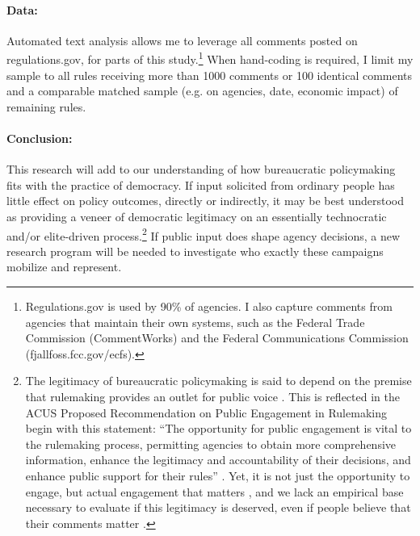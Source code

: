 \paragraph{Data:} Automated text analysis allows me to leverage all comments posted on regulations.gov, for parts of this study.\footnote{Regulations.gov is used by 90\% of agencies. I also capture comments from agencies that maintain their own systems, such as the Federal Trade Commission (CommentWorks) and the Federal Communications Commission (fjallfoss.fcc.gov/ecfs).} When hand-coding is required, I limit my sample to all rules receiving more than 1000 comments or 100 identical comments and a comparable matched sample (e.g. on agencies, date, economic impact) of remaining rules. %






\paragraph{Conclusion:} This research will add to our understanding of how  bureaucratic policymaking fits with the practice of democracy.
If input solicited from ordinary people has little effect on policy outcomes, directly or indirectly, it may be best understood as providing a veneer of democratic legitimacy on an essentially technocratic and/or elite-driven process.\footnote{
The legitimacy of bureaucratic policymaking is said to depend on the premise that rulemaking provides an outlet for public voice \citep{Croley2003, Rosenbloom2003}. This is reflected in the ACUS Proposed Recommendation on Public Engagement in Rulemaking begin with this statement: ``The opportunity for public engagement is vital to the rulemaking process, permitting agencies to obtain more comprehensive information, enhance the legitimacy and accountability of their decisions, and enhance public support for their rules'' \citep{ACUS2018}. Yet, it is not just the opportunity to engage, but actual engagement that matters \citep{Herz2018}, and we lack an empirical base necessary to evaluate if this legitimacy is deserved, even if people believe that their comments matter \citep{Yackee2014JPART}.
} 
If public input does shape agency decisions, a new research program will be needed to investigate who exactly these campaigns mobilize and represent.


